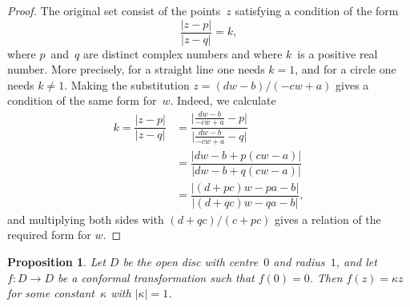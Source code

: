 \documentclass{amsproc}
\newtheorem{proposition}[theorem]{Proposition}
\theoremstyle{definition}
\theoremstyle{remark}
\numberwithin{equation}{section}
\begin{document}
\begin{proof}
The original set consist of the points~$ z $ satisfying a condition of the form
$$
\dfrac{|z - p|}{|z - q|} = k,
$$
where $ p $~and~$ q $ are distinct complex numbers and where $ k $~is a positive real number. More precisely, for a straight line one needs $ k = 1 $,
and for a circle one needs $ k \neq 1 $. Making the substitution $ z = (dw - b)/(-cw + a) $ gives a condition of the same form for~$ w $. Indeed,
we calculate
\begin{align*}
k = \dfrac{|z - p|}{|z - q|} &= \dfrac{\big|\frac{dw - b}{-cw + a} - p\big|}{\big|\frac{dw - b}{-cw + a} - q\big|} \\
&= \dfrac{|dw - b + p(cw - a)|}{|dw - b + q(cw - a)|} \\
&= \dfrac{|(d + pc)w - pa - b|}{|(d + qc)w - qa - b|},
\end{align*}
and multiplying both sides with $ (d + qc)/(c + pc) $ gives a relation of the required form for $ w $.
\end{proof}

\begin{proposition} \label{CMP15.2}
Let $ D $ be the open disc with centre~$ 0 $ and radius~$ 1 $, and let $ f: D \to D $ be a conformal transformation such that $ f(0) = 0 $. Then $ f(z) = \kappa z $ for
some constant~$ \kappa $ with $ |\kappa| = 1 $.
\end{proposition}
\end{document}
